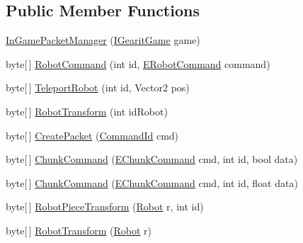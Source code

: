 \subsection*{Public Member Functions}
\begin{DoxyCompactItemize}
\item 
\hyperlink{classgearit_1_1src_1_1_network_1_1_in_game_packet_manager_ae0868cb6208daefa04ff3d842f7421e7}{In\+Game\+Packet\+Manager} (\hyperlink{interfacegearit_1_1src_1_1game_1_1_i_gearit_game}{I\+Gearit\+Game} game)
\item 
byte\mbox{[}$\,$\mbox{]} \hyperlink{classgearit_1_1src_1_1_network_1_1_in_game_packet_manager_accbb9c794e69fa98c8f228e4814146fc}{Robot\+Command} (int id, \hyperlink{classgearit_1_1src_1_1_network_1_1_in_game_packet_manager_ae3674f6abcd4c0edf853e4557b2c4fbc}{E\+Robot\+Command} command)
\item 
byte\mbox{[}$\,$\mbox{]} \hyperlink{classgearit_1_1src_1_1_network_1_1_in_game_packet_manager_ada0a17c8e937ea9482e7d2c3d9257e33}{Teleport\+Robot} (int id, Vector2 pos)
\item 
byte\mbox{[}$\,$\mbox{]} \hyperlink{classgearit_1_1src_1_1_network_1_1_in_game_packet_manager_a6401ef6d5f324ba3a16e05c2aae0847f}{Robot\+Transform} (int id\+Robot)
\item 
byte\mbox{[}$\,$\mbox{]} \hyperlink{classgearit_1_1src_1_1_network_1_1_in_game_packet_manager_a538a94f3e5aec0843b496f65aef6f11d}{Create\+Packet} (\hyperlink{classgearit_1_1src_1_1_network_1_1_in_game_packet_manager_a804b93da8e2442dd26ce397495bbca75}{Command\+Id} cmd)
\item 
byte\mbox{[}$\,$\mbox{]} \hyperlink{classgearit_1_1src_1_1_network_1_1_in_game_packet_manager_a9619713446175d0e74890ebe182ebd8e}{Chunk\+Command} (\hyperlink{classgearit_1_1src_1_1_network_1_1_in_game_packet_manager_a211d3f59eba6772f7b8abc3260a2e776}{E\+Chunk\+Command} cmd, int id, bool data)
\item 
byte\mbox{[}$\,$\mbox{]} \hyperlink{classgearit_1_1src_1_1_network_1_1_in_game_packet_manager_a856a2af3ab0d49ea3e8553b047091d12}{Chunk\+Command} (\hyperlink{classgearit_1_1src_1_1_network_1_1_in_game_packet_manager_a211d3f59eba6772f7b8abc3260a2e776}{E\+Chunk\+Command} cmd, int id, float data)
\item 
byte\mbox{[}$\,$\mbox{]} \hyperlink{classgearit_1_1src_1_1_network_1_1_in_game_packet_manager_a99a9ebb0fee6fc559fe7b73f4fa676ff}{Robot\+Piece\+Transform} (\hyperlink{classgearit_1_1src_1_1robot_1_1_robot}{Robot} r, int id)
\item 
byte\mbox{[}$\,$\mbox{]} \hyperlink{classgearit_1_1src_1_1_network_1_1_in_game_packet_manager_a7bb84925309750d01453626d929f9882}{Robot\+Transform} (\hyperlink{classgearit_1_1src_1_1robot_1_1_robot}{Robot} r)

\end{DoxyCompactItemize}
